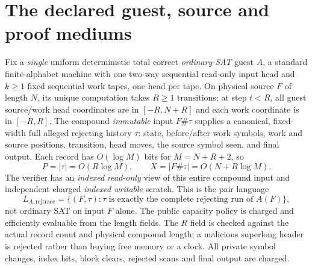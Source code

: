 \documentclass[11pt]{article}
\begin{document}
\section{The declared guest, source and proof mediums}
Fix a \emph{single} uniform deterministic total correct \emph{ordinary-SAT} guest $A$, a standard finite-alphabet machine with one two-way sequential read-only input head and $k\ge1$ fixed sequential work tapes, one head per tape. On physical source $F$ of length $N$, its unique computation takes $R\ge1$ transitions; at step $t<R$, all guest source/work head coordinates are in $[-R,N+R]$ and each work coordinate is in $[-R,R]$. The compound \emph{immutable} input $F\#\tau$ supplies a canonical, fixed-width full alleged rejecting history $\tau$: state, before/after work symbols, work and source positions, transition, head moves, the source symbol seen, and final output. Each record has $O(\log M)$ bits for $M=N+R+2$, so
\[
 P=|\tau|=O(R\log M),\qquad X=|F\#\tau|=O(N+R\log M).
\]
The verifier has an \emph{indexed read-only} view of this entire compound input and independent charged \emph{indexed writable} scratch. This is the pair language
\[
 L_{A,\mathrm{rejtrace}}=\{(F,\tau): \tau\text{ is exactly the complete rejecting run of }A(F)\},
\]
not ordinary SAT on input $F$ alone. The public capacity policy is charged and efficiently evaluable from the length fields. The $R$ field is checked against the actual record count and physical compound length; a malicious superlong header is rejected rather than buying free memory or a clock. All private symbol changes, index bits, block clears, rejected scans and final output are charged.
\end{document}
